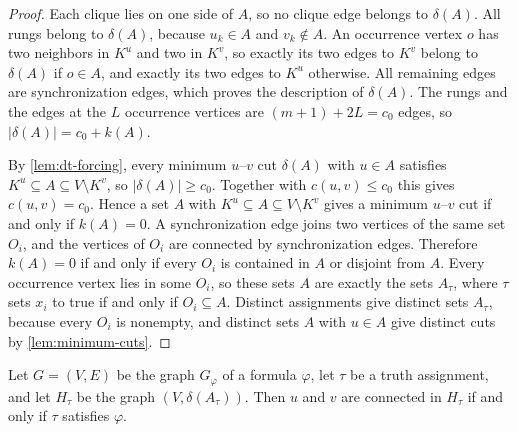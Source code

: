 \documentclass[pdflatex,sn-mathphys-num]{sn-jnl}%
\theoremstyle{thmstyleone}%
\theoremstyle{thmstyletwo}%
\theoremstyle{thmstylethree}%
\begin{document}
\begin{proof}
Each clique lies on one side of $A$, so no clique edge belongs to $\delta(A)$.
All rungs belong to $\delta(A)$, because $u_k \in A$ and $v_k \notin A$.
An occurrence vertex $o$ has two neighbors in $K^u$ and two in $K^v$, so exactly its two edges to $K^v$ belong to $\delta(A)$ if $o \in A$, and exactly its two edges to $K^u$ otherwise.
All remaining edges are synchronization edges, which proves the description of $\delta(A)$.
The rungs and the edges at the $L$ occurrence vertices are $(m + 1) + 2L = c_0$ edges, so $|\delta(A)| = c_0 + k(A)$.

By \cref{lem:dt-forcing}, every minimum $u$--$v$ cut $\delta(A)$ with $u \in A$ satisfies $K^u \subseteq A \subseteq V \setminus K^v$, so $|\delta(A)| \geq c_0$.
Together with $c(u, v) \leq c_0$ this gives $c(u, v) = c_0$.
Hence a set $A$ with $K^u \subseteq A \subseteq V \setminus K^v$ gives a minimum $u$--$v$ cut if and only if $k(A) = 0$.
A synchronization edge joins two vertices of the same set $O_i$, and the vertices of $O_i$ are connected by synchronization edges.
Therefore $k(A) = 0$ if and only if every $O_i$ is contained in $A$ or disjoint from $A$.
Every occurrence vertex lies in some $O_i$, so these sets $A$ are exactly the sets $A_\tau$, where $\tau$ sets $x_i$ to true if and only if $O_i \subseteq A$.
Distinct assignments give distinct sets $A_\tau$, because every $O_i$ is nonempty, and distinct sets $A$ with $u \in A$ give distinct cuts by \cref{lem:minimum-cuts}.
\end{proof}

\begin{lemma}
\label{lem:dt-cut-graphs}
Let $G = (V, E)$ be the graph $G_\varphi$ of a formula $\varphi$, let $\tau$ be a truth assignment, and let $H_\tau$ be the graph $(V, \delta(A_\tau))$.
Then $u$ and $v$ are connected in $H_\tau$ if and only if $\tau$ satisfies $\varphi$.
\end{lemma}
\end{document}
